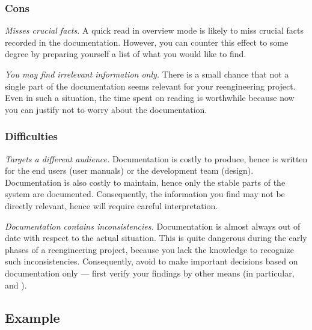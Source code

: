 \documentclass[a4paper,10pt,twoside]{book}
\begin{document}
\subsubsection*{Cons}

\begin{bulletlist}
  \item \emph{Misses crucial facts.}
A quick read in overview mode is likely to miss crucial facts recorded in the documentation. However, you can counter this effect to some degree by preparing yourself a list of what you would like to find.

  \item \emph{You may find irrelevant information only.}
There is a small chance that not a single part of the documentation seems relevant for your reengineering project. Even in such a situation, the time spent on reading is worthwhile because now you can justify not to worry about the documentation.
\end{bulletlist}

\subsubsection*{Difficulties}

\begin{bulletlist}
  \item \emph{Targets a different audience.}
Documentation is costly to produce, hence is written for the end users (\eg user manuals) or the development team (\eg design). Documentation is also costly to maintain, hence only the stable parts of the system are documented. Consequently, the information you find may not be directly relevant, hence will require careful interpretation.

  \item \emph{Documentation contains inconsistencies.}
Documentation is almost always out of date with respect to the actual situation. This is quite dangerous during the early phases of a reengineering project, because you lack the knowledge to recognize such inconsistencies. Consequently, avoid to make important decisions based on documentation only --- first verify your findings by other means (in particular,  and ).
\end{bulletlist}

\subsection*{Example}
\end{document}

